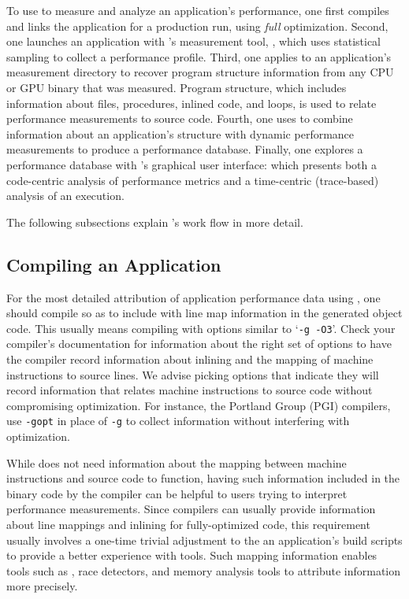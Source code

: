 \documentclass[11pt,twoside,letterpaper]{report}
\begin{document}
To use \HPCToolkit{} to measure and analyze an application's performance, one first compiles and links the application for a production run, using \emph{full} optimization.
Second, one launches an application with \HPCToolkit{}'s measurement tool, \hpcrun{}, which uses statistical sampling to collect a performance profile.
Third, one applies \hpcstruct{} to an application's measurement directory to recover program structure information from any CPU or GPU binary that was measured.
Program structure, which includes information about files, procedures, inlined code, and loops, is used to relate performance measurements to source code.
Fourth, one uses \hpcprof{} to combine information about an application's structure with dynamic performance measurements to produce a performance database.
Finally, one explores a performance database with \HPCToolkit{}'s graphical user interface: \hpcviewer{} which presents
both a code-centric analysis of performance metrics and a time-centric (trace-based) analysis of an execution.

The following subsections explain \HPCToolkit{}'s work flow in more detail.



\subsection{Compiling an Application}

For the most detailed attribution of application performance data using \HPCToolkit{}, one should compile so as to include with line map information in the generated object code.
This usually means compiling with options similar to `\texttt{-g -O3}'. Check your compiler's documentation for information about the right set of options to have the compiler record information about inlining and the mapping of machine instructions to source lines. We advise picking  options that indicate they will record information that relates machine instructions to source code without compromising optimization. For instance, the Portland Group (PGI) compilers, use \texttt{-gopt} in place of \texttt{-g} to collect information without interfering with optimization.

While \HPCToolkit{} does not need information about the mapping between machine instructions and source code to function,
having such information included in the binary code by the compiler can be helpful to users trying to interpret performance measurements.
Since compilers can usually provide information about line mappings and inlining for fully-optimized code,
this requirement usually involves a one-time trivial adjustment to the an application's build scripts
to provide a better experience with tools. Such mapping information enables tools such as \HPCToolkit{},
race detectors, and memory analysis tools to attribute information more precisely.
\end{document}
